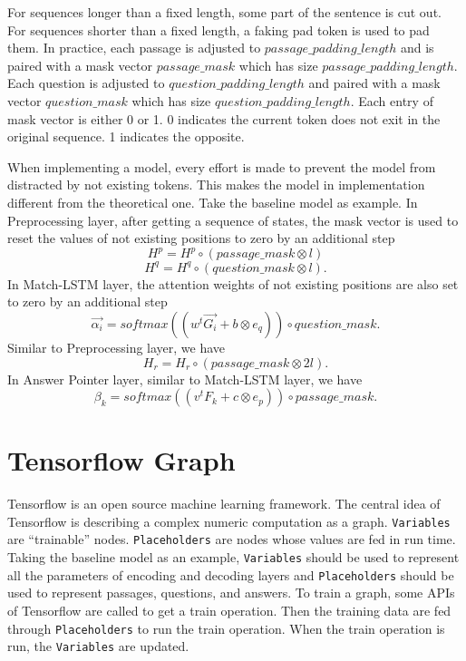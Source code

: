 \documentclass[modernstyle,12pt]{sjsuthesis}
\theoremstyle{definition}
\begin{document}
For sequences longer than a fixed length, some part of the sentence is cut out. For sequences shorter than a fixed length, a faking pad token is used to pad them. In practice, each passage is adjusted to $passage\_padding\_length$ and is paired with a mask vector $passage\_mask$ which has size $passage\_padding\_length$. Each question is adjusted to $question\_padding\_length$ and paired with a mask vector $question\_mask$ which has size $question\_padding\_length$. Each entry of mask vector is either 0 or 1. 0 indicates the current token does not exit in the original sequence. 1 indicates the opposite.

When implementing a model, every effort is made to prevent the model from distracted by not existing tokens. This makes the model in implementation different from the theoretical one. Take the baseline model as example. In Preprocessing layer, after getting a sequence of states, the mask vector is used to reset the values of not existing positions to zero by an additional step
$$H^p = H^p \circ (passage\_mask \otimes l)$$
$$H^q = H^q \circ (question\_mask \otimes l).$$
In Match-LSTM layer, the attention weights of not existing positions are also set to zero by an additional step
$$\overrightarrow{\alpha _i} = softmax( (w^t\overrightarrow{G_i} + b \otimes e_q) ) \circ question\_mask .$$
Similar to Preprocessing layer, we have
$$H_r = H_r \circ (passage\_mask \otimes 2l).$$
In Answer Pointer layer, similar to Match-LSTM layer, we have
$$\beta _k = softmax( (v^tF_k + c \otimes e_p) ) \circ passage\_mask.$$


\section{Tensorflow Graph}

Tensorflow is an open source machine learning framework. The central idea of Tensorflow is describing a complex numeric computation as a graph.  {\tt Variables} are ``trainable'' nodes.  {\tt Placeholders} are nodes whose values are fed in run time. Taking the baseline model as an example,  {\tt Variables} should be used to represent all the parameters of encoding and decoding layers and {\tt Placeholders} should be used to represent passages, questions, and answers. To train a graph, some APIs of Tensorflow are called to get a train operation. Then the training data are fed through {\tt Placeholders} to run the train operation. When the train operation is run, the {\tt Variables} are updated.
\end{document}
